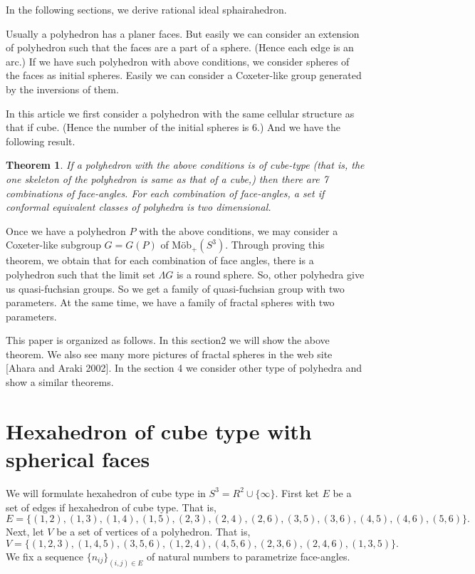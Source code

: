 \documentclass[dvipdfmx]{interact}
\theoremstyle{plain}%
\newtheorem{theorem}{Theorem}[section]
\theoremstyle{definition}
\theoremstyle{remark}
\theoremstyle{problemstyle}
\begin{document}
In the following sections, we derive rational ideal sphairahedron.

Usually a polyhedron has a planer faces. But easily we can consider an
extension of polyhedron such that the faces are a part of a
sphere. (Hence each edge is an arc.) If we have such polyhedron with
above conditions, we consider spheres of the faces as initial
spheres. Easily we can consider a Coxeter-like group generated by the
inversions of them.

In this article we first consider a polyhedron with the same cellular
structure as that if cube. (Hence the number of the initial spheres is
6.) And we have the following result.

\begin{theorem}
 If a polyhedron with the above conditions is of cube-type (that is,
 the one skeleton of the polyhedron is same as that of a cube,) then
 there are 7 combinations of face-angles. For each combination of
 face-angles, a set if conformal equivalent classes of polyhedra is two
 dimensional.
\end{theorem}

Once we have a polyhedron $P$ with the above conditions, we may consider
a Coxeter-like subgroup $G=G(P)$ of M\"ob$_+(S^3)$. Through proving this
theorem, we obtain that for each combination of face angles, there is a
polyhedron such that the limit set $\Lambda{G}$ is a round sphere. So,
other polyhedra give us quasi-fuchsian groups. So we get a family of
quasi-fuchsian group with two parameters. At the same time, we have a
family of fractal spheres with two parameters.

This paper is organized as follows. In this section2 we will show the
above theorem. We also see many more pictures of fractal spheres in the
web site [Ahara and Araki 2002]. In the section 4 we consider other type
of polyhedra and show a similar theorems.

\section{Hexahedron of cube type with spherical faces}
We will formulate hexahedron of cube type in $S^3 = R^2 \cup \{\infty\}$.
First ket $E$ be a set of edges if hexahedron of cube type. That is,
$$
E = \{(1, 2), (1, 3), (1, 4), (1, 5), (2, 3), (2, 4), (2, 6), (3, 5),
(3, 6), (4, 5), (4, 6), (5, 6)\}.
$$
Next, let $V$ be a set of vertices of a polyhedron. That is,
$$
V = \{(1, 2, 3), (1, 4, 5), (3, 5, 6), (1, 2, 4), (4, 5, 6), (2, 3, 6),
(2, 4, 6), (1, 3, 5)\}.
$$
We fix a sequence $\{n_{ij}\}_{(i,j) \in E}$ of natural numbers to
parametrize face-angles.
\end{document}

